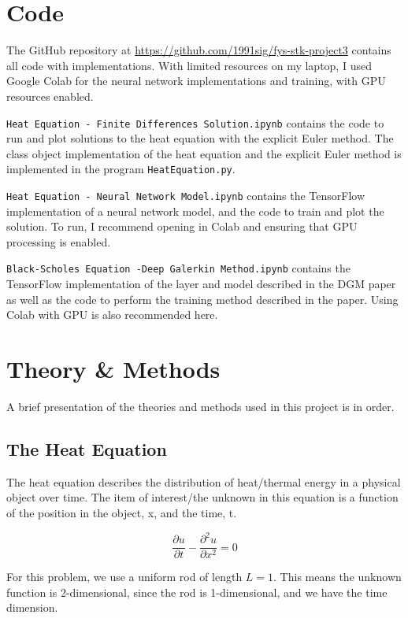 \documentclass[]{article}
\begin{document}
\section{Code}\label{code}

The GitHub repository at
\url{https://github.com/1991sig/fys-stk-project3} contains all code with
implementations. With limited resources on my laptop, I used Google
Colab for the neural network implementations and training, with GPU
resources enabled.

\texttt{Heat\ Equation\ -\ Finite\ Differences\ Solution.ipynb} contains
the code to run and plot solutions to the heat equation with the
explicit Euler method. The class object implementation of the heat
equation and the explicit Euler method is implemented in the program
\texttt{HeatEquation.py}.

\texttt{Heat\ Equation\ -\ Neural\ Network\ Model.ipynb} contains the
TensorFlow implementation of a neural network model, and the code to
train and plot the solution. To run, I recommend opening in Colab and
ensuring that GPU processing is enabled.

\texttt{Black-Scholes\ Equation\ -Deep\ Galerkin\ Method.ipynb} contains
the TensorFlow implementation of the layer and model described in the
DGM paper as well as the code to perform the training method described
in the paper. Using Colab with GPU is also recommended here.

\section{Theory \& Methods}\label{theory-methods}

A brief presentation of the theories and methods used in this project is
in order.

\subsection{The Heat Equation}\label{the-heat-equation}

The heat equation describes the distribution of heat/thermal energy in a
physical object over time. The item of interest/the unknown in this
equation is a function of the position in the object, x, and the time,
t.

\[\frac{\partial u}{\partial t} - \frac{\partial^2 u}{\partial x^2} = 0\]

For this problem, we use a uniform rod of length \(L=1\). This means the
unknown function is 2-dimensional, since the rod is 1-dimensional, and
we have the time dimension.
\end{document}

